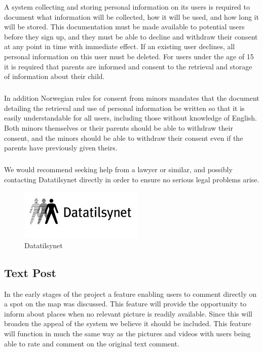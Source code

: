 A system collecting and storing personal information on its users is required to document what information will be collected, how it will be used, and how long it will be stored. This documentation must be made available to potential users before they sign up, and they must be able to decline and withdraw their consent at any point in time with immediate effect. If an existing user declines, all personal information on this user must be deleted. For users under the age of 15 it is required that parents are informed and consent to the retrieval and storage of information about their child.
\subparagraph{} In addition Norwegian rules for consent from minors mandates that the document detailing the retrieval and use of personal information be written so that it is easily understandable for all users, including those without knowledge of English. Both minors themselves or their parents should be able to withdraw their consent, and the minors should be able to withdraw their consent even if the parents have previously given theirs.
\subparagraph{} We would recommend seeking help from a lawyer or similar, and possibly contacting Datatilsynet directly in order to ensure no serious legal problems arise.

\begin{figure}[ht!]
  \centering
  \includegraphics[width=\linewidth]{./FurtherWork/img/Datatilsynet}
  \caption{Datatilsynet}
  \label{fig:FurtherDatatilsynetLogo}
\end{figure}

\subsection{Text Post}
\label{subsec:FurtherRequiredTextPost}
In the early stages of the project a feature enabling users to comment directly on a spot on the map was discussed. This feature will provide the opportunity to inform about places when no relevant picture is readily available. Since this will broaden the appeal of the system we believe it should be included. This feature will function in much the same way as the pictures and videos with users being able to rate and comment on the original text comment.

